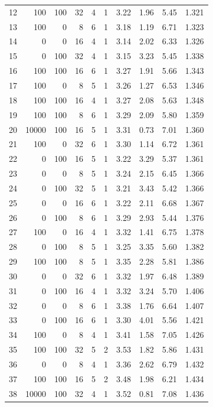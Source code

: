 \begin{footnotesize}
\begin{longtable}{@{}rrrrrrrrrr@{}}
12 & 100 & 100 & 32 & 4 & 1 & 3.22 & 1.96 & 5.45 & 1.321 \\
13 & 100 & 0 & 8 & 6 & 1 & 3.18 & 1.19 & 6.71 & 1.323 \\
14 & 0 & 0 & 16 & 4 & 1 & 3.14 & 2.02 & 6.33 & 1.326 \\
15 & 0 & 100 & 32 & 4 & 1 & 3.15 & 3.23 & 5.45 & 1.338 \\
16 & 100 & 100 & 16 & 6 & 1 & 3.27 & 1.91 & 5.66 & 1.343 \\
17 & 100 & 0 & 8 & 5 & 1 & 3.26 & 1.27 & 6.53 & 1.346 \\
18 & 100 & 100 & 16 & 4 & 1 & 3.27 & 2.08 & 5.63 & 1.348 \\
19 & 100 & 100 & 8 & 6 & 1 & 3.29 & 2.09 & 5.80 & 1.359 \\
20 & 10000 & 100 & 16 & 5 & 1 & 3.31 & 0.73 & 7.01 & 1.360 \\
21 & 100 & 0 & 32 & 6 & 1 & 3.30 & 1.14 & 6.72 & 1.361 \\
22 & 0 & 100 & 16 & 5 & 1 & 3.22 & 3.29 & 5.37 & 1.361 \\
23 & 0 & 0 & 8 & 5 & 1 & 3.24 & 2.15 & 6.45 & 1.366 \\
24 & 0 & 100 & 32 & 5 & 1 & 3.21 & 3.43 & 5.42 & 1.366 \\
25 & 0 & 0 & 16 & 6 & 1 & 3.22 & 2.11 & 6.68 & 1.367 \\
26 & 0 & 100 & 8 & 6 & 1 & 3.29 & 2.93 & 5.44 & 1.376 \\
27 & 100 & 0 & 16 & 4 & 1 & 3.32 & 1.41 & 6.75 & 1.378 \\
28 & 0 & 100 & 8 & 5 & 1 & 3.25 & 3.35 & 5.60 & 1.382 \\
29 & 100 & 100 & 8 & 5 & 1 & 3.35 & 2.28 & 5.81 & 1.386 \\
30 & 0 & 0 & 32 & 6 & 1 & 3.32 & 1.97 & 6.48 & 1.389 \\
31 & 0 & 100 & 16 & 4 & 1 & 3.32 & 3.24 & 5.70 & 1.406 \\
32 & 0 & 0 & 8 & 6 & 1 & 3.38 & 1.76 & 6.64 & 1.407 \\
33 & 0 & 100 & 16 & 6 & 1 & 3.30 & 4.01 & 5.56 & 1.421 \\
34 & 100 & 0 & 8 & 4 & 1 & 3.41 & 1.58 & 7.05 & 1.426 \\
35 & 100 & 100 & 32 & 5 & 2 & 3.53 & 1.82 & 5.86 & 1.431 \\
36 & 0 & 0 & 8 & 4 & 1 & 3.36 & 2.62 & 6.79 & 1.432 \\
37 & 100 & 100 & 16 & 5 & 2 & 3.48 & 1.98 & 6.21 & 1.434 \\
38 & 10000 & 100 & 32 & 4 & 1 & 3.52 & 0.81 & 7.08 & 1.436 \\

\end{longtable}
\end{footnotesize}
